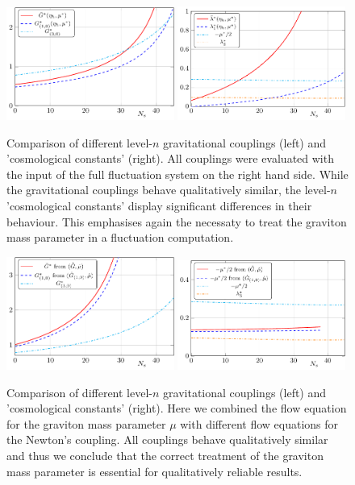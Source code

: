 \documentclass[11pt]{book} %
\begin{document}
{\begin{figure}
\includegraphics[width=0.49\textwidth]{All-g-from-fluc}
\hfill
\includegraphics[width=0.49\textwidth]{All-lam-from-fluc}
\caption{
Comparison of different level-$n$ gravitational couplings (left) and 'cosmological constants' (right).
All couplings were evaluated with the input of the full fluctuation system on the right hand side.
While the gravitational couplings behave qualitatively similar, the level-$n$ 'cosmological constants' display significant differences in their behaviour.
This emphasises again the necessaty to treat the graviton mass parameter in a fluctuation computation.
}
\label{fig:All-from-fluc}
\end{figure}

\begin{figure}
\includegraphics[width=0.49\textwidth]{All-g-from-mu}
\hfill
\includegraphics[width=0.49\textwidth]{All-lam-from-mu}
\caption{Comparison of different level-$n$ gravitational couplings (left) and 'cosmological constants' (right).
Here we combined the flow equation for the graviton mass parameter $\mu$ with different flow equations for the Newton's coupling.
All couplings behave qualitatively similar and thus we conclude that the correct treatment of the graviton mass parameter is essential for qualitatively reliable results.}
\label{fig:All-from-mu}
\end{figure}


}
\end{document}
